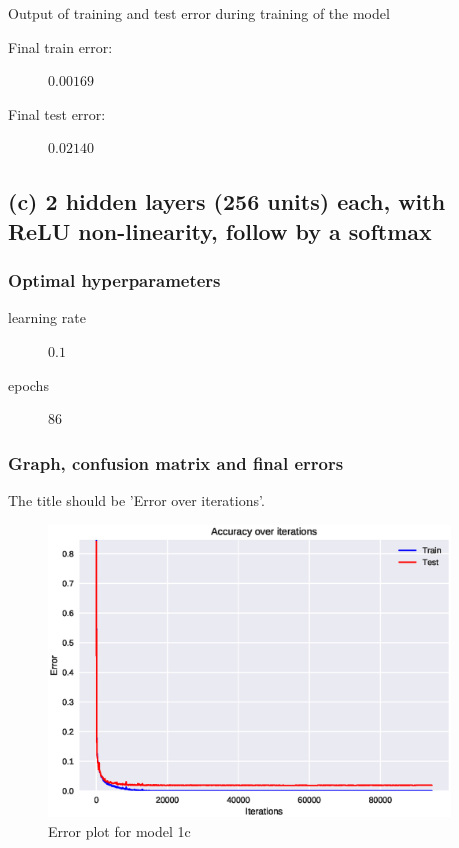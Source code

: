 \documentclass{article}
\begin{document}
Output of training and test error during training of the model



\begin{description}
\item[Final train error:] $0.00169$
\item[Final test error:] $0.02140$
\end{description}

\newpage

\subsection{(c) 2 hidden layers (256 units) each, with ReLU non-linearity,
  follow by a softmax}

\subsubsection{Optimal hyperparameters}

\begin{description}
\item[learning rate] $0.1$
\item[epochs] $86$
\end{description}

\subsubsection{Graph, confusion matrix and final errors}

The title should be 'Error over iterations'.

\begin{figure}[H]
  \centering
  \includegraphics[width=0.95\textwidth]{error_1c.eps}
  \caption{Error plot for model 1c}
  \label{fig:err_1c}
\end{figure}
\end{document}
